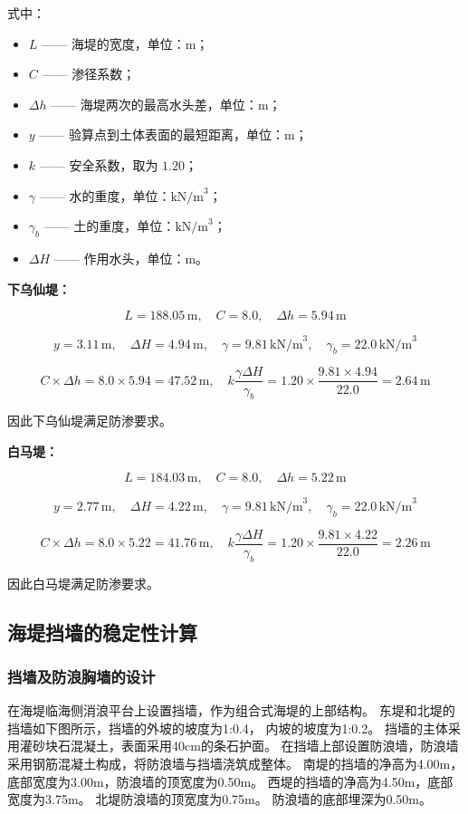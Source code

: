 \documentclass[UTF8, a4paper, 12pt]{ctexart} %
\begin{document}
式中：
\begin{itemize}
    \item $L$ —— 海堤的宽度，单位：$\text{m}$；
    \item $C$ —— 渗径系数；
    \item $\Delta h$ —— 海堤两次的最高水头差，单位：$\text{m}$；
    \item $y$ —— 验算点到土体表面的最短距离，单位：$\text{m}$；
    \item $k$ —— 安全系数，取为 $1.20$；
    \item $\gamma$ —— 水的重度，单位：$\text{kN/m}^3$；
    \item $\gamma_b$ —— 土的重度，单位：$\text{kN/m}^3$；
    \item $\Delta H$ —— 作用水头，单位：$\text{m}$。
\end{itemize}


\textbf{下乌仙堤：}

\[
L = 188.05\,\text{m}, \quad C = 8.0, \quad \Delta h = 5.94\,\text{m}
\]

\[
y = 3.11\,\text{m}, \quad \Delta H = 4.94\,\text{m}, \quad \gamma = 9.81\,\text{kN/m}^3, \quad \gamma_b = 22.0\,\text{kN/m}^3
\]

\[
C \times \Delta h = 8.0 \times 5.94 = 47.52\,\text{m}, \quad k \frac{\gamma \Delta H}{\gamma_b} = 1.20 \times \frac{9.81 \times 4.94}{22.0} = 2.64\,\text{m}
\]

因此下乌仙堤满足防渗要求。

\textbf{白马堤：}

\[
L = 184.03\,\text{m}, \quad C = 8.0, \quad \Delta h = 5.22\,\text{m}
\]

\[
y = 2.77\,\text{m}, \quad \Delta H = 4.22\,\text{m}, \quad \gamma = 9.81\,\text{kN/m}^3, \quad \gamma_b = 22.0\,\text{kN/m}^3
\]

\[
C \times \Delta h = 8.0 \times 5.22 = 41.76\,\text{m}, \quad k \frac{\gamma \Delta H}{\gamma_b} = 1.20 \times \frac{9.81 \times 4.22}{22.0} = 2.26\,\text{m}
\]

因此白马堤满足防渗要求。


\subsection{海堤挡墙的稳定性计算}

\subsubsection{挡墙及防浪胸墙的设计}
在海堤临海侧消浪平台上设置挡墙，作为组合式海堤的上部结构。
东堤和北堤的挡墙如下图所示，挡墙的外坡的坡度为1:0.4，
内坡的坡度为1:0.2。
挡墙的主体采用灌砂块石混凝土，表面采用40cm的条石护面。
在挡墙上部设置防浪墙，防浪墙采用钢筋混凝土构成，将防浪墙与挡墙浇筑成整体。
南堤的挡墙的净高为4.00m，底部宽度为3.00m，防浪墙的顶宽度为0.50m。
西堤的挡墙的净高为4.50m，底部宽度为3.75m。
北堤防浪墙的顶宽度为0.75m。
防浪墙的底部埋深为0.50m。
\end{document}
